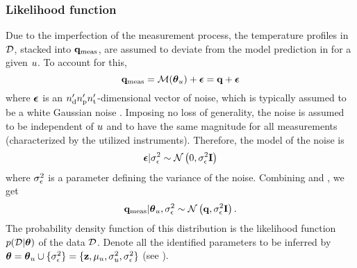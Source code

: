 \subsubsection{Likelihood function}
Due to the imperfection of the measurement process, the temperature profiles in $\mathcal{D}$, stacked into $\mathbf{q}_{\text{meas}}$, are assumed to deviate from the model prediction in  for a given $u$. To account for this,
\begin{equation} \elabel{noisy-measurements}
  \mvT_\meas = \model{\vparam_\u} + \vnoise = \mvT + \vnoise
\end{equation}
where $\boldsymbol\epsilon$ is an ${n_\text{d}'} {n_\text{p}'} {n_\text{t}'}$-dimensional vector of noise, which is typically assumed to be a white Gaussian noise \cite{rasmussen2006, marzouk2009}.
Imposing no loss of generality, the noise is assumed to be independent of $u$ and to have the same magnitude for all measurements (characterized by the utilized instruments). Therefore, the model of the noise is
\begin{equation} \elabel{noise-model}
  \vnoise | \sigma^2_\noise \sim \gaussian{0}{\sigma^2_\noise \mI}
\end{equation}
where $\sigma^2_\epsilon$ is a parameter defining the variance of the noise.
Combining  and , we get
\begin{equation} \elabel{likelihood}
  \mvT_\meas | \vparam_\u, \sigma_\noise^2 \sim \gaussian{\mvT}{\sigma_\noise^2 \mI}.
\end{equation}
The probability density function of this distribution is the likelihood function $\f{\Data | \vparam}$ of the data $\mathcal{D}$.
Denote all the identified parameters to be inferred by ${\boldsymbol\theta} = {\boldsymbol\theta}_u \cup \{ \sigma_\epsilon^2 \} = \{ \mathbf{z}, \mu_u, \sigma_u^2, \sigma_\epsilon^2 \}$ (see ).

